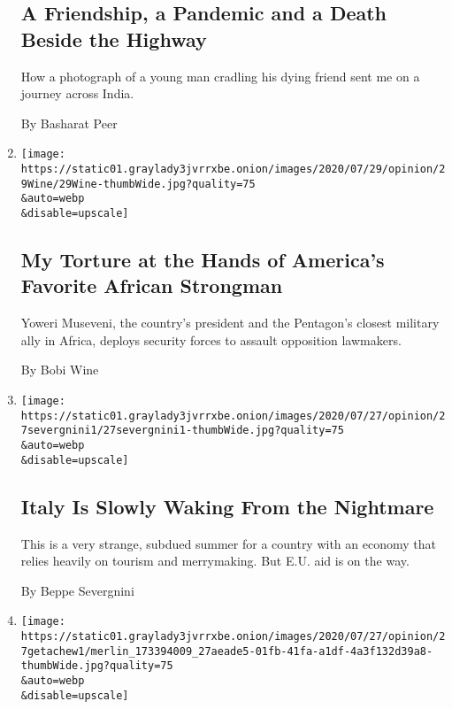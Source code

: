 \begin{enumerate}
{  \subsection{A Friendship, a Pandemic and a Death Beside the
  Highway}\label{a-friendship-a-pandemic-and-a-death-beside-the-highway}}

  How a photograph of a young man cradling his dying friend sent me on a
  journey across India.

  By Basharat Peer
\item
  \href{/2020/07/29/opinion/uganda-museveni-repression.html}{}

  \texttt{[image: https://static01.graylady3jvrrxbe.onion/images/2020/07/29/opinion/29Wine/29Wine-thumbWide.jpg?quality=75\\\&auto=webp\\\&disable=upscale]}

  \hypertarget{my-torture-at-the-hands-of-americas-favorite-african-strongman}{%
  \subsection{My Torture at the Hands of America's Favorite African
  Strongman}\label{my-torture-at-the-hands-of-americas-favorite-african-strongman}}

  Yoweri Museveni, the country's president and the Pentagon's closest
  military ally in Africa, deploys security forces to assault opposition
  lawmakers.

  By Bobi Wine
\item
  \href{/2020/07/27/opinion/italy-coronavirus.html}{}

  \texttt{[image: https://static01.graylady3jvrrxbe.onion/images/2020/07/27/opinion/27severgnini1/27severgnini1-thumbWide.jpg?quality=75\\\&auto=webp\\\&disable=upscale]}

  \hypertarget{italy-is-slowly-waking-from-the-nightmare}{%
  \subsection{Italy Is Slowly Waking From the
  Nightmare}\label{italy-is-slowly-waking-from-the-nightmare}}

  This is a very strange, subdued summer for a country with an economy
  that relies heavily on tourism and merrymaking. But E.U. aid is on the
  way.

  By Beppe Severgnini
\item
  \href{/2020/07/27/opinion/sunday/decolonization-statues.html}{}

  \texttt{[image: https://static01.graylady3jvrrxbe.onion/images/2020/07/27/opinion/27getachew1/merlin\_173394009\_27aeade5-01fb-41fa-a1df-4a3f132d39a8-thumbWide.jpg?quality=75\\\&auto=webp\\\&disable=upscale]}


\end{enumerate}
